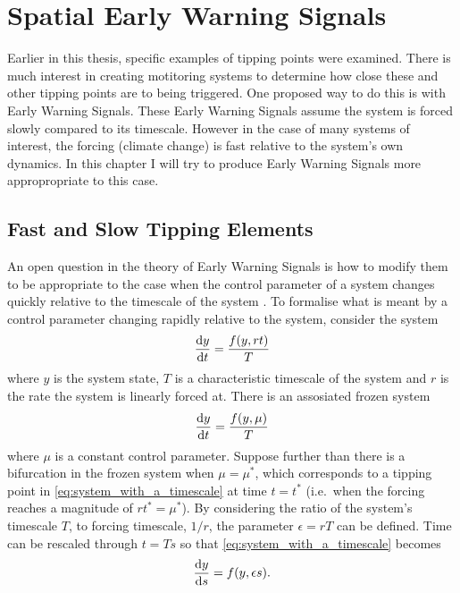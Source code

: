\chapter{Spatial Early Warning Signals}
\label{chapter:spatial_ews}
\graphicspath{{spatial_ews/figs}}

Earlier in this thesis, specific examples of tipping points were examined.
There is much interest in creating motitoring systems to determine how close these and other tipping points are to being triggered.
One proposed way to do this is with Early Warning Signals. These Early Warning Signals assume the system is forced slowly compared to its timescale.
However in the case of many systems of interest, the forcing (climate change) is fast relative to the system's own dynamics.
In this chapter I will try to produce Early Warning Signals more appropropriate to this case.

\section{Fast and Slow Tipping Elements}
An open question in the theory of Early Warning Signals is how to modify them to be appropriate to the case when the control parameter of a system
changes quickly relative to the timescale of the system \parencite{VanderBolt2021}. To formalise what is meant by a control parameter changing rapidly relative
to the system, consider the system
\begin{equation}
  \label{eq:system_with_a_timescale}
  \dv{y}{t} = \frac{f(y,rt)}{T}
\end{equation}
where $y$ is the system state, $T$ is a characteristic timescale of the system and $r$ is the rate the system is linearly forced
at. There is an assosiated frozen system
\begin{equation}
  \label{eq:system_with_a_timescale_frozen}
  \dv{y}{t} = \frac{f(y,\mu)}{T}
\end{equation}
where $\mu$ is a constant control parameter. Suppose further than there is a bifurcation in the frozen system when
$\mu = \mu^*$, which corresponds to a tipping point in \cref{eq:system_with_a_timescale} at time $t = t^*$ (i.e.\ when the forcing reaches a magnitude of $rt^* = \mu^*$).
By considering the ratio of the system's timescale $T$, to forcing timescale, $1/r$,  the parameter $\epsilon = rT$ can be defined. Time can be rescaled through $t=Ts$
so that \cref{eq:system_with_a_timescale} becomes
\begin{equation}
  \label{eq:system_with_a_timescale_rescaled}
  \dv{y}{s} = f(y,\epsilon s).
\end{equation}

